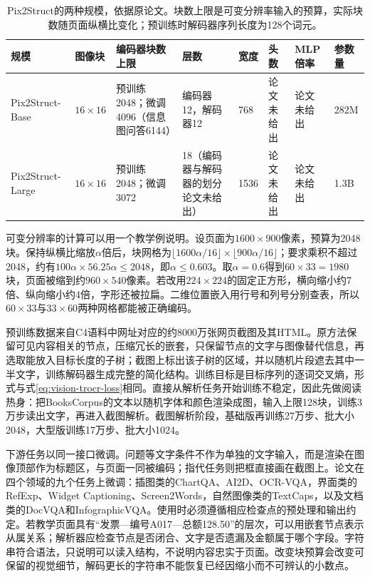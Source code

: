 \begin{table}[tbp]
  \centering
  \small
  \begin{tabularx}{\linewidth}{@{}p{22mm}p{12mm}Xp{16mm}p{10mm}p{10mm}p{12mm}p{12mm}@{}}
    \toprule
    规模 & 图像块 & 编码器块数上限 & 层数 & 宽度 & 头数 & MLP倍率 & 参数量\\
    \midrule
    Pix2Struct-Base & $16\times16$ & 预训练2048；微调4096（信息图问答6144） & 编码器12，解码器12 & 768 & 论文未给出 & 论文未给出 & 282M\\
    Pix2Struct-Large & $16\times16$ & 预训练2048；微调3072 & 18（编码器与解码器的划分论文未给出） & 1536 & 论文未给出 & 论文未给出 & 1.3B\\
    \bottomrule
  \end{tabularx}
  \caption{Pix2Struct的两种规模，依据原论文。块数上限是可变分辨率输入的预算，实际块数随页面纵横比变化；预训练时解码器序列长度为128个词元。}
  \label{tab:vision-understanding-pix2struct-config}
\end{table}

可变分辨率的计算可以用一个教学例说明。设页面为$1600\times900$像素，预算为2048块。保持纵横比缩放$\alpha$倍后，块网格为$\lfloor1600\alpha/16\rfloor\times\lfloor900\alpha/16\rfloor$；要求乘积不超过2048，约有$100\alpha\times56.25\alpha\leq2048$，即$\alpha\leq0.603$。取$\alpha=0.6$得到$60\times33=1980$块，页面被缩到约$960\times540$像素。若改用$224\times224$的固定正方形，横向缩小约7倍、纵向缩小约4倍，字形还被拉扁。二维位置嵌入用行号和列号分别查表，所以$60\times33$与$33\times60$两种网格都能被正确编码。

预训练数据来自C4语料中网址对应的约8000万张网页截图及其HTML。原方法保留可见内容相关的节点，压缩冗长的嵌套，只保留节点的文字与图像替代信息，再选取能放入目标长度的子树；截图上标出该子树的区域，并以随机片段遮去其中一半文字，训练解码器生成完整的简化结构。训练目标是目标序列的逐词交叉熵，形式与式\eqref{eq:vision-trocr-loss}相同。直接从解析任务开始训练不稳定，因此先做阅读热身：把BooksCorpus的文本以随机字体和颜色渲染成图，输入上限128块，训练3万步读出文字，再进入截图解析。截图解析阶段，基础版再训练27万步、批大小2048，大型版训练17万步、批大小1024。

下游任务以同一接口微调。问题等文字条件不作为单独的文字输入，而是渲染在图像顶部作为标题区，与页面一同被编码；指代任务则把框直接画在截图上。论文在四个领域的九个任务上微调：插图类的ChartQA、AI2D、OCR-VQA，界面类的RefExp、Widget Captioning、Screen2Words，自然图像类的TextCaps，以及文档类的DocVQA和InfographicVQA。使用时必须遵循相应检查点的预处理和输出约定。若教学页面具有“发票—编号A017—总额128.50”的层次，可以用嵌套节点表示从属关系；解析器应检查节点是否闭合、文字是否遗漏及金额属于哪个字段。字符串符合语法，只说明可以读入结构，不说明内容忠实于页面。改变块预算会改变可保留的视觉细节，解码更长的字符串不能恢复已经因缩小而不可辨认的小数点。

